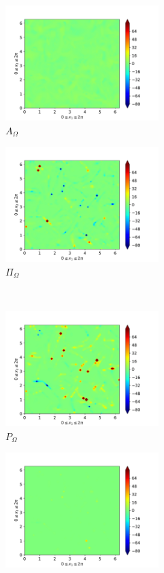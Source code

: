 \begin{figure}[H]
\begin{subfigure}{0.45\textwidth}
        \includegraphics[height=1.75in]{media/run-cds-65/A-enst-1330}
        \caption{$A_{\Omega}$}
    \end{subfigure}
    \newline
    \begin{subfigure}{0.45\textwidth}
        \includegraphics[height=1.75in]{media/run-cds-65/Pi-enst-1330}
        \caption{$\Pi_{\Omega}$}
    \end{subfigure}
    ~
    \begin{subfigure}{0.45\textwidth}
        \includegraphics[height=1.75in]{media/run-cds-65/P-enst-1330}
        \caption{$P_{\Omega}$}
    \end{subfigure}
    \newline
    \begin{subfigure}{0.45\textwidth}
        \includegraphics[height=1.75in]{media/run-cds-65/B-enst-1330}

\end{subfigure}
\end{figure}
